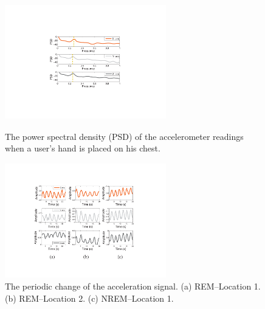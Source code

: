 \begin{figure}
	\centering
	\begin{minipage}[t]{.475\textwidth}
	\centering
\includegraphics[width=7cm,height=5cm]{Figures/PSD.pdf}
\caption{The power spectral density (PSD) of the accelerometer readings when a user's hand is placed on his chest.}\label{fig:PSD}
	\end{minipage}%
\hfill
	\begin{minipage}[t]{.475\textwidth}
	\centering
	\includegraphics[width=7cm,height=5cm]{Figures/breath_ok1.pdf}
	\caption{The periodic change of the acceleration signal. (a) REM--Location 1. (b) REM--Location 2.  (c) NREM--Location 1.}\label{fig:breath_ok1}
	\end{minipage}
\end{figure}


